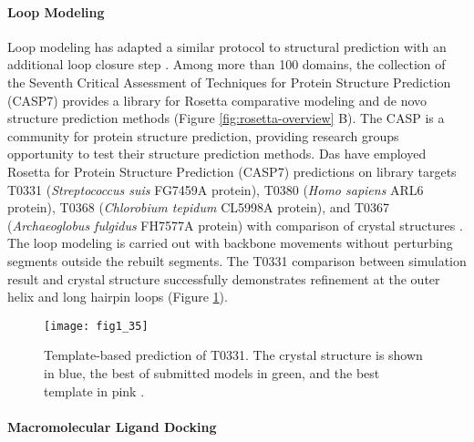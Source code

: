 \begin{refsection}
\paragraph{Loop Modeling}
Loop modeling has adapted a similar protocol to  structural
prediction with an additional loop closure step \cite{Das2008}. Among more
than 100 domains, the collection of the Seventh Critical Assessment of
Techniques for Protein Structure Prediction (CASP7) provides a library for
Rosetta comparative modeling and de novo structure prediction methods
\cite{Das2008} (Figure \ref{fig:rosetta-overview} B). The CASP is a community
for protein structure prediction, providing research groups opportunity to test
their structure prediction methods. Das  have employed Rosetta
for Protein Structure Prediction (CASP7) predictions on library targets T0331
(\emph{Streptococcus suis} FG7459A protein), T0380 (\emph{Homo sapiens} ARL6
protein), T0368 (\emph{Chlorobium tepidum} CL5998A protein), and T0367
(\emph{Archaeoglobus fulgidus} FH7577A protein) with comparison of crystal
structures \cite{Das2007a}. The loop modeling is carried out with backbone
movements without perturbing segments outside the rebuilt segments. The T0331
comparison between simulation result and crystal structure successfully
demonstrates refinement at the outer helix and long hairpin loops
\cite{Das2007a} (Figure \ref{fig:t0331}).
\begin{figure}[htbp] \centering \texttt{[image: fig1\_35]}
    \caption[Template-based prediction of T0331. The crystal structure is
    shown in blue, the best of submitted models in green, and the best template
in pink.]{Template-based prediction of T0331. The crystal structure is
    shown in blue, the best of submitted models in green, and the best template
    in pink \cite{Das2007a}.} \label{fig:t0331}
\end{figure}

\paragraph{Macromolecular Ligand Docking}


\end{refsection}
